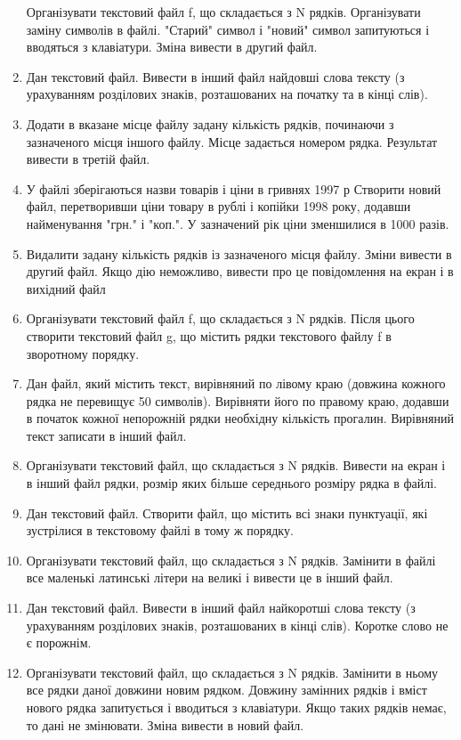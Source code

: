 \documentclass[]{article}
\begin{document}
\begin{enumerate}
Організувати текстовий файл f, що складається з N рядків. Організувати
заміну символів в файлі. "Старий" символ і "новий" символ запитуються і
вводяться з клавіатури. Зміна вивести в другий файл.
\item
Дан текстовий файл. Вивести в інший файл найдовші слова тексту (з
урахуванням розділових знаків, розташованих на початку та в кінці слів).
\item
Додати в вказане місце файлу задану кількість рядків, починаючи з
зазначеного місця іншого файлу. Місце задається номером рядка. Результат
вивести в третій файл.
\item
У файлі зберігаються назви товарів і ціни в гривнях 1997 р Створити
новий файл, перетворивши ціни товару в рублі і копійки 1998 року,
додавши найменування "грн." і "коп.". У зазначений рік ціни зменшилися в
1000 разів.
\item
Видалити задану кількість рядків із зазначеного місця файлу. Зміни
вивести в другий файл. Якщо дію неможливо, вивести про це повідомлення
на екран і в вихідний файл
\item
Організувати текстовий файл f, що складається з N рядків. Після цього
створити текстовий файл g, що містить рядки текстового файлу f в
зворотному порядку.
\item
Дан файл, який містить текст, вирівняний по лівому краю (довжина кожного
рядка не перевищує 50 символів). Вирівняти його по правому краю, додавши
в початок кожної непорожній рядки необхідну кількість прогалин.
Вирівняний текст записати в інший файл.
\item
Організувати текстовий файл, що складається з N рядків. Вивести на екран
і в інший файл рядки, розмір яких більше середнього розміру рядка в
файлі.
\item
Дан текстовий файл. Створити файл, що містить всі знаки пунктуації, які
зустрілися в текстовому файлі в тому ж порядку.
\item
Організувати текстовий файл, що складається з N рядків. Замінити в файлі
все маленькі латинські літери на великі і вивести це в інший файл.
\item
Дан текстовий файл. Вивести в інший файл найкоротші слова тексту (з
урахуванням розділових знаків, розташованих в кінці слів). Коротке слово
не є порожнім.
\item
Організувати текстовий файл, що складається з N рядків. Замінити в ньому
все рядки даної довжини новим рядком. Довжину замінних рядків і вміст
нового рядка запитується і вводиться з клавіатури. Якщо таких рядків
немає, то дані не змінювати. Зміна вивести в новий файл.



\end{enumerate}
\end{document}

